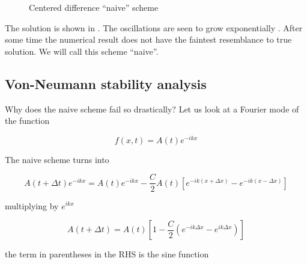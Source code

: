 \begin{figure}
  \begin{center}
  \end{center}
  \caption[]{Centered difference ``naive'' scheme}
  \label{fig:naive-adv}
\end{figure}


The solution is shown in . The oscillations are
seen to grow exponentially . After some time the
numerical result does not have the faintest resemblance to true
solution. We will call this scheme ``naive''. 

\subsection{Von-Neumann stability analysis}

Why does the naive scheme fail so drastically? Let us look at a Fourier mode of the function

\begin{equation}
f(x,t) = A(t) e^{-ikx}
\end{equation}


The naive scheme turns into

\begin{equation}
A(t+\Delta t)e^{-ikx} = A(t)e^{-ikx} - \frac{C}{2}A(t)\left[e^{-ik(x+\Delta x)} - e^{-ik(x-\Delta x)}\right]
\end{equation}

multiplying by $e^{ikx}$


\begin{equation}
A(t+\Delta t) = A(t) \left[ 1 - \frac{C}{2}\left(e^{-ik\Delta x} -  e^{ik\Delta x}\right)\right]
\end{equation}

the term in parentheses in the RHS is the sine function

  

